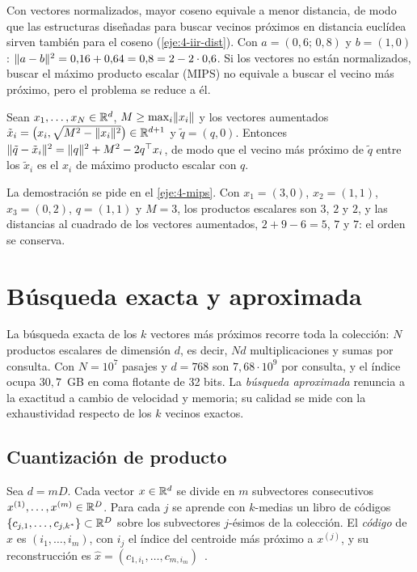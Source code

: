 Con vectores normalizados, mayor coseno equivale a menor distancia, de modo que las estructuras diseñadas para buscar vecinos próximos en distancia euclídea sirven también para el coseno (\cref{eje:4-iir-dist}). Con $a=(0{,}6;\,0{,}8)$ y $b=(1,0)$: $\lVert a-b\rVert^{2}=0{,}16+0{,}64=0{,}8=2-2\cdot 0{,}6$. Si los vectores no están normalizados, buscar el máximo producto escalar (MIPS) no equivale a buscar el vecino más próximo, pero el problema se reduce a él.

\begin{proposicion}\label{prop:mips}
Sean $x_1,\dots,x_N\in\mathbb{R}^{d}$, $M\ge\max_i\lVert x_i\rVert$ y los vectores aumentados $\tilde x_i=\bigl(x_i,\sqrt{M^{2}-\lVert x_i\rVert^{2}}\bigr)\in\mathbb{R}^{d+1}$ y $\tilde q=(q,0)$. Entonces $\lVert\tilde q-\tilde x_i\rVert^{2}=\lVert q\rVert^{2}+M^{2}-2q^{\top}x_i$, de modo que el vecino más próximo de $\tilde q$ entre los $\tilde x_i$ es el $x_i$ de máximo producto escalar con $q$.
\end{proposicion}

La demostración se pide en el \cref{eje:4-mips}. Con $x_1=(3,0)$, $x_2=(1,1)$, $x_3=(0,2)$, $q=(1,1)$ y $M=3$, los productos escalares son $3$, $2$ y $2$, y las distancias al cuadrado de los vectores aumentados, $2+9-6=5$, $7$ y $7$: el orden se conserva.

\section{Búsqueda exacta y aproximada}

La búsqueda exacta de los $k$ vectores más próximos recorre toda la colección: $N$ productos escalares de dimensión $d$, es decir, $Nd$ multiplicaciones y sumas por consulta. Con $N=10^{7}$ pasajes y $d=768$ son $7{,}68\cdot 10^{9}$ por consulta, y el índice ocupa $30{,}7$~GB en coma flotante de 32 bits. La \emph{búsqueda aproximada} renuncia a la exactitud a cambio de velocidad y memoria; su calidad se mide con la exhaustividad respecto de los $k$ vecinos exactos.

\subsection{Cuantización de producto}

\begin{definicion}\label{def:pq}
Sea $d=mD$. Cada vector $x\in\mathbb{R}^{d}$ se divide en $m$ subvectores consecutivos $x^{(1)},\dots,x^{(m)}\in\mathbb{R}^{D}$. Para cada $j$ se aprende con $k$-medias un libro de códigos $\{c_{j,1},\dots,c_{j,k^\ast}\}\subset\mathbb{R}^{D}$ sobre los subvectores $j$-ésimos de la colección. El \emph{código} de $x$ es $(i_1,\dots,i_m)$, con $i_j$ el índice del centroide más próximo a $x^{(j)}$, y su reconstrucción es $\hat x=(c_{1,i_1},\dots,c_{m,i_m})$~\cite{jegou}.
\end{definicion}

